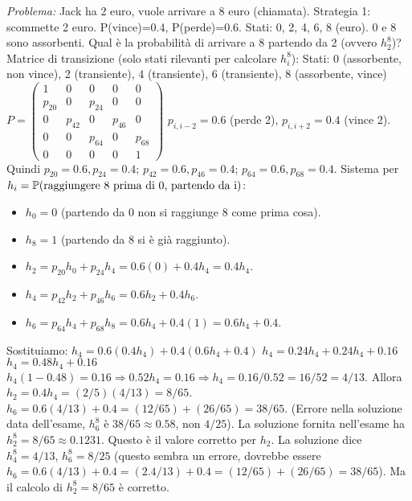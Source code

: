 \documentclass[12pt,a4paper]{article}
\begin{document}
\begin{example}
\textit{Problema:} Jack ha 2 euro, vuole arrivare a 8 euro (chiamata). Strategia 1: scommette 2 euro. P(vince)=0.4, P(perde)=0.6. Stati: 0, 2, 4, 6, 8 (euro). 0 e 8 sono assorbenti.
Qual è la probabilità di arrivare a 8 partendo da 2 (ovvero $h_2^8$)?
Matrice di transizione (solo stati rilevanti per calcolare $h_i^8$):
Stati: 0 (assorbente, non vince), 2 (transiente), 4 (transiente), 6 (transiente), 8 (assorbente, vince)
$P = \begin{pmatrix}
1 & 0 & 0 & 0 & 0 \\ %
p_{20} & 0 & p_{24} & 0 & 0 \\ %
0 & p_{42} & 0 & p_{46} & 0 \\ %
0 & 0 & p_{64} & 0 & p_{68} \\ %
0 & 0 & 0 & 0 & 1    %
\end{pmatrix}$
$p_{i, i-2} = 0.6$ (perde 2), $p_{i, i+2} = 0.4$ (vince 2).
Quindi $p_{20}=0.6, p_{24}=0.4$; $p_{42}=0.6, p_{46}=0.4$; $p_{64}=0.6, p_{68}=0.4$.
Sistema per $h_i = \mathbb{P}(\text{raggiungere 8 prima di 0, partendo da i})$:
\begin{itemize}
    \item $h_0 = 0$ (partendo da 0 non si raggiunge 8 come prima cosa).
    \item $h_8 = 1$ (partendo da 8 si è già raggiunto).
    \item $h_2 = p_{20}h_0 + p_{24}h_4 = 0.6(0) + 0.4h_4 = 0.4h_4$.
    \item $h_4 = p_{42}h_2 + p_{46}h_6 = 0.6h_2 + 0.4h_6$.
    \item $h_6 = p_{64}h_4 + p_{68}h_8 = 0.6h_4 + 0.4(1) = 0.6h_4 + 0.4$.
\end{itemize}
Sostituiamo:
$h_4 = 0.6(0.4h_4) + 0.4(0.6h_4 + 0.4)$
$h_4 = 0.24h_4 + 0.24h_4 + 0.16$
$h_4 = 0.48h_4 + 0.16$
$h_4(1 - 0.48) = 0.16 \Rightarrow 0.52h_4 = 0.16 \Rightarrow h_4 = 0.16/0.52 = 16/52 = 4/13$.
Allora $h_2 = 0.4 h_4 = (2/5)(4/13) = 8/65$.
$h_6 = 0.6(4/13) + 0.4 = (12/65) + (26/65) = 38/65$. (Errore nella soluzione data dell'esame, $h_6^8$ è $38/65 \approx 0.58$, non $4/25$).
La soluzione fornita nell'esame ha $h_2^8 = 8/65 \approx 0.1231$. Questo è il valore corretto per $h_2$.
La soluzione dice $h_4^8 = 4/13$, $h_6^8 = 8/25$ (questo sembra un errore, dovrebbe essere $h_6 = 0.6(4/13)+0.4 = (2.4/13)+0.4 = (12/65) + (26/65) = 38/65$).
Ma il calcolo di $h_2^8=8/65$ è corretto.


\end{example}
\end{document}
